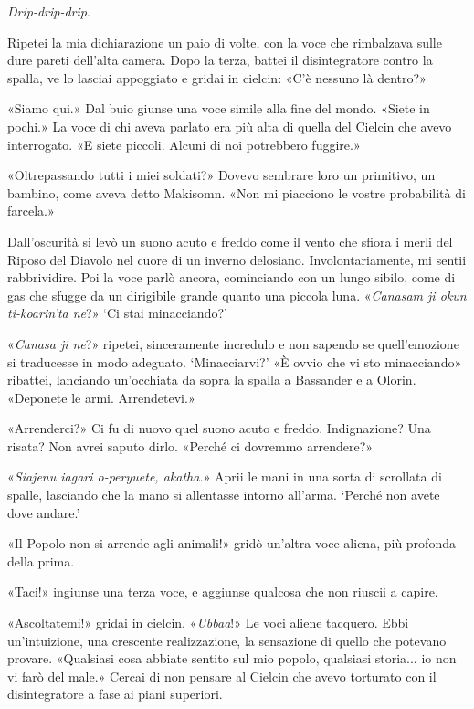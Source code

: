 \emph{Drip-drip-drip}.

Ripetei la mia dichiarazione un paio di volte, con la voce che
rimbalzava sulle dure pareti dell'alta camera. Dopo la terza, battei il
disintegratore contro la spalla, ve lo lasciai appoggiato e gridai in
cielcin: «C'è nessuno là dentro?»

«Siamo qui.» Dal buio giunse una voce simile alla fine del mondo. «Siete
in pochi.» La voce di chi aveva parlato era più alta di quella del
Cielcin che avevo interrogato. «E siete piccoli. Alcuni di noi
potrebbero fuggire.»

«Oltrepassando tutti i miei soldati?» Dovevo sembrare loro un primitivo,
un bambino, come aveva detto Makisomn. «Non mi piacciono le vostre
probabilità di farcela.»

Dall'oscurità si levò un suono acuto e freddo come il vento che sfiora i
merli del Riposo del Diavolo nel cuore di un inverno delosiano.
Involontariamente, mi sentii rabbrividire. Poi la voce parlò ancora,
cominciando con un lungo sibilo, come di gas che sfugge da un dirigibile
grande quanto una piccola luna. «\emph{Canasam ji okun ti-koarin'ta
	ne}?» `Ci stai minacciando?'

«\emph{Canasa ji ne}?» ripetei, sinceramente incredulo e non sapendo se
quell'emozione si traducesse in modo adeguato. `Minacciarvi?' «È ovvio
che vi sto minacciando» ribattei, lanciando un'occhiata da sopra la
spalla a Bassander e a Olorin. «Deponete le armi. Arrendetevi.»

«Arrenderci?» Ci fu di nuovo quel suono acuto e freddo. Indignazione?
Una risata? Non avrei saputo dirlo. «Perché ci dovremmo arrendere?»

«\emph{Siajenu iagari o-peryuete, akatha.}» Aprii le mani in una sorta
di scrollata di spalle, lasciando che la mano si allentasse intorno
all'arma. `Perché non avete dove andare.'

«Il Popolo non si arrende agli animali!» gridò un'altra voce aliena, più
profonda della prima.

«Taci!» ingiunse una terza voce, e aggiunse qualcosa che non riuscii a
capire.

«Ascoltatemi!» gridai in cielcin. «\emph{Ubbaa}!» Le voci aliene
tacquero. Ebbi un'intuizione, una crescente realizzazione, la sensazione
di quello che potevano provare. «Qualsiasi cosa abbiate sentito sul mio
popolo, qualsiasi storia... io non vi farò del male.» Cercai di non
pensare al Cielcin che avevo torturato con il disintegratore a fase ai
piani superiori.

